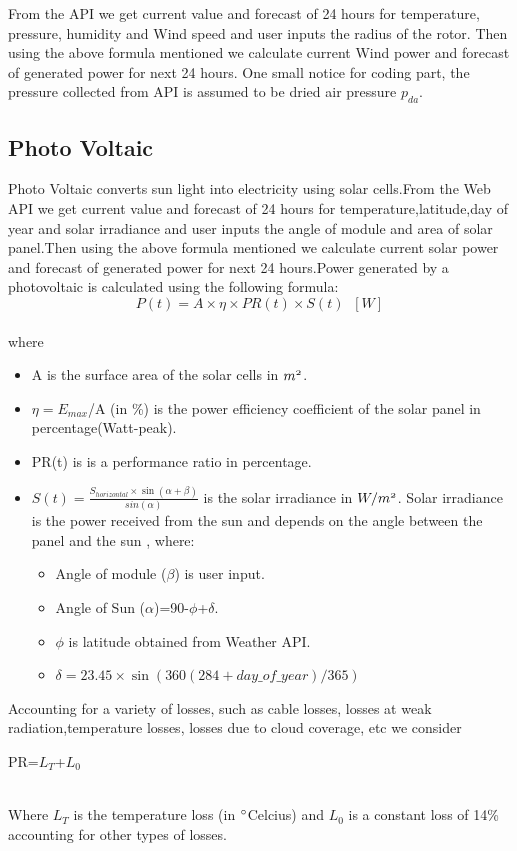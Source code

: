 \documentclass[runningheads]{llncs}
\begin{document}
From the API we get current value and forecast of 24 hours for temperature, pressure, humidity and Wind speed and user inputs the radius of the rotor. Then using the above formula mentioned we calculate current  Wind power and forecast of generated power for next 24 hours. One small notice for coding part, the pressure collected from API is assumed to be dried air pressure $p_{da}$. \\
\subsection{Photo Voltaic}
Photo Voltaic converts sun light into electricity using solar cells.From the Web API we get current value and forecast of 24 hours for temperature,latitude,day of year and solar irradiance and user inputs the angle of module and area of solar panel.Then using the above formula mentioned we calculate current solar power and forecast of generated power for next 24 hours.Power generated by a photovoltaic is calculated  using the following formula:\\
\[P(t)=A \times \eta \times PR(t) \times S(t) \;\;[W]\]\\ 
where
\begin{itemize}
\item A is the surface area of the solar cells in $\mathnormal{m^2}$.
\item $\eta = E_{max}$/A (in \%)  is the power efficiency coefficient of the solar panel in percentage(Watt-peak).
\item PR(t) is is a performance ratio in percentage.
\item $S(t) = \frac{S_{horizontal} \times \sin(\alpha +\beta)}{sin(\alpha)} $ is the solar irradiance in $W/\mathnormal{m^2}$. Solar irradiance is the power received from the sun and depends on the angle
between the panel and the sun \cite{Irradiance}, where:
\begin{itemize}
\item Angle of module ($\beta$) is user input.
\item Angle of Sun ($\alpha$)=90-$\phi$+$\delta$.
\item $\phi$ is latitude obtained from Weather API.
\item $\delta = 23.45\times\sin(360(284+day\_of\_year)/365)$
\end{itemize}
\end{itemize}
Accounting  for a variety of losses, such as cable losses, losses at weak radiation,temperature losses, losses due to  cloud coverage, etc we consider \\
\centerline{PR=$L_T$+$L_0$}\\
Where $L_T$ is the temperature loss (in $\degree$Celcius) and $L_0$ is a constant loss of 14\% accounting for other types of losses.\\
\end{document}
